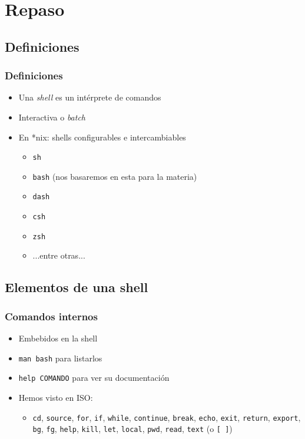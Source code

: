 \section{Repaso}
\subsection{Definiciones}
\begin{frame}
  \frametitle{Definiciones}
  \begin{itemize}
    \item Una \textit{shell} es un intérprete de comandos
    \item Interactiva o \textit{batch}
    \item En *nix: shells configurables e intercambiables
    \begin{itemize}
      \item \texttt{sh}
      \item \texttt{bash} (nos basaremos en esta para la materia)
      \item \texttt{dash}
      \item \texttt{csh}
      \item \texttt{zsh}
      \item ...entre otras...
    \end{itemize}
  \end{itemize}
\end{frame}

\subsection{Elementos de una shell}

\begin{frame}
  \frametitle{Comandos internos}
  \begin{itemize}
    \item Embebidos en la shell
    \item \texttt{man bash} para listarlos
    \item \texttt{help COMANDO} para ver su documentación
    \item Hemos visto en ISO:
    \begin{itemize}
      \item \texttt{cd}, \texttt{source}, \texttt{for}, \texttt{if}, \texttt{while},
        \texttt{continue}, \texttt{break}, \texttt{echo}, \texttt{exit}, \texttt{return}, \texttt{export},
        \texttt{bg}, \texttt{fg}, \texttt{help}, \texttt{kill}, \texttt{let}, \texttt{local},
        \texttt{pwd}, \texttt{read}, \texttt{text} (o \texttt{[ ]})
    \end{itemize}
  \end{itemize}
\end{frame}

